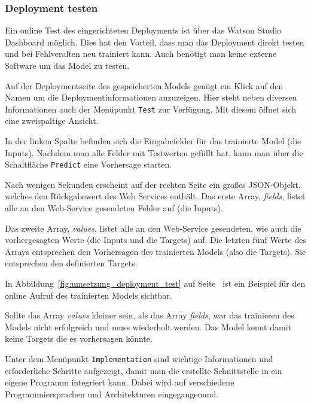 \subsubsection{Deployment testen}
Ein online Test des eingerichteten Deployments ist über das Watson Studio Dashboard möglich. Dies hat den Vorteil, dass
man das Deployment direkt testen und bei Fehlveralten neu trainiert kann. Auch benötigt man keine externe Software um
das Model zu testen.

Auf der Deploymentseite des gespeicherten Models genügt ein Klick auf den Namen um die Deploymentinformationen anzuzeigen.
Hier steht neben diversen Informationen auch der Menüpunkt \texttt{Test} zur Verfügung. Mit diesem öffnet sich eine
zweispaltige Ansicht.

In der linken Spalte befinden sich die Eingabefelder für das trainierte Model (die Inputs). Nachdem man alle Felder mit
Testwerten gefüllt hat, kann man über die Schaltfläche \texttt{Predict} eine Vorhersage starten.

Nach wenigen Sekunden erscheint auf der rechten Seite ein großes JSON-Objekt, welches den Rückgabewert des Web Services
enthält. Das erste Array, \textit{fields}, listet alle an den Web-Service gesendeten Felder auf (die Inputs).

Das zweite Array, \textit{values}, listet alle an den Web-Service gesendeten, wie auch die vorhergesagten Werte (die
Inputs und die Targets) auf. Die letzten fünf Werte des Arrays entsprechen den Vorhersagen des trainierten Models (also
die Targets). Sie entsprechen den definierten Targets.

In Abbildung~\ref{fig:umsetzung_deployment_test} auf Seite~\pageref{fig:umsetzung_deployment_test} ist ein Beispiel für
den online Aufruf des trainierten Models sichtbar.

Sollte das Array \textit{values} kleiner sein, als das Array \textit{fields}, war das trainieren des Models nicht
erfolgreich und muss wiederholt werden. Das Model kennt damit keine Targets die es vorhersagen könnte.

Unter dem Menüpunkt \texttt{Implementation} sind wichtige Informationen und erforderliche Schritte aufgezeigt, damit
man die erstellte Schnittstelle in ein eigene Programm integriert kann. Dabei wird auf verschiedene Programmiersprachen
und Architekturen eingegangenund.

